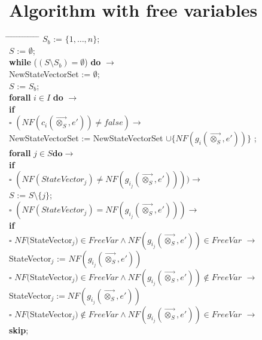 \documentclass[a4paper,10pt]{article}
\theoremstyle{plain}
\theoremstyle{definition}
\newcommand{\ovr}{\overrightarrow}
\newcommand{\tb}{\textbf}
\newcommand{\ra}{$\rightarrow$}
\newcommand{\sq}{$\square$}
\newcommand{\tab}{\hspace*{5.mm} \= \hspace*{5.mm} \= \hspace*{5.mm} \= \hspace*{5.mm} \= \hspace*{5.mm} \= \hspace*{5.mm}  \= \hspace*{5.mm}  \= \hspace*{5.mm}  \= \hspace*{5.mm} \= \hspace*{5.mm} \= \hspace*{5.mm}  \= \hspace*{5.mm}  \= \hspace*{5.mm}\kill}
\begin{document}
\section{Algorithm with free variables}
\begin{tabbing}
\tab
$S_b$ := $\lbrace 1, \ldots, n \rbrace$; \\
$S$ := $\emptyset$;\\ 
\tb{while}  ($ (S \setminus S_b) = \emptyset $) \tb{do} \ra \\
  \> NewStateVectorSet := $\emptyset$;\\
  \> $S$ := $S_b$; \\
  \> \tb{forall} $i \in I$ \tb{do} \ra \\
  \>	\>	\tb{if} \\
  \>	\>	\sq \> $(NF(c_i(\ovr{\otimes_S},e')) \not= false) \rightarrow$ \\
  \>	\>	\> 	\>NewStateVectorSet := NewStateVectorSet $\cup \lbrace NF(g_i(\ovr{\otimes_S},e')) \rbrace$ ;\\  
  \>	\>	\>  	\>  \tb{forall} $j \in S \tb{do} \rightarrow$ \\
  \>	\>	\>  	\>	\>  	    \tb{if} \\
  \>	\>	\>  	\>   	\>         $\square$  \> $(NF(StateVector_j) \neq NF(g_{i_j}(\ovr{\otimes_S}, e')))) \rightarrow$ \\
  \>	\>	\>  	\>    	\>       \>    \>            $S$ := $S\setminus \lbrace j \rbrace$;\\
  \>	\>	\>  	\>    	\>        $\square$ \> $ (NF(StateVector_j) = NF(g_{i_j}(\ovr{\otimes_S}, e'))) \rightarrow$\\
  \>	\>	\> 	\>    	\>        \> 	\>  	\tb{if}\\
  \>	\>	\>	\>	\>	  \>	\>	\sq 	\> $NF($StateVector$_j) \in FreeVar \wedge NF(g_{i_j}(\ovr{\otimes_S}, e')) \in FreeVar$ \ra \\
  \>	\>	\>	\>	\>	  \>	\>		\>	\>	StateVector$_j$ := $NF(g_{i_j}(\ovr{\otimes_S}, e'))$\\ 

  \>	\>	\>	\>	\>	  \>	\>	\sq 	\> $NF($StateVector$_j) \in FreeVar \wedge NF(g_{i_j}(\ovr{\otimes_S}, e')) \not\in FreeVar$ \ra \\
  \>	\>	\>	\>	\>	  \>	\>		\>	\>	StateVector$_j := NF(g_{i_j}(\ovr{\otimes_S}, e'))$\\ 

  \>	\>	\>	\>	\>	  \>	\>	\sq 	\> $NF($StateVector$_j) \not\in FreeVar \wedge NF(g_{i_j}(\ovr{\otimes_S}, e')) \in FreeVar$ \ra \\
  \>	\>	\>	\>	\>	  \>	\>		\>	\>	\tb{skip};\\ 


\end{tabbing}
\end{document}
